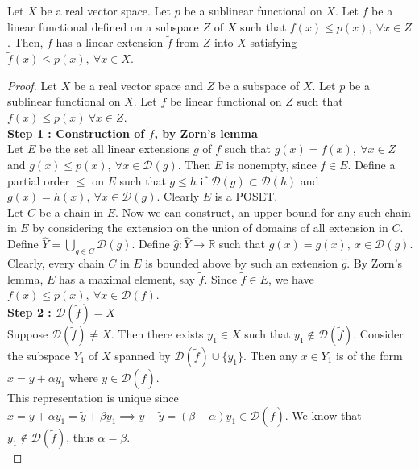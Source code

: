 \begin{theorem}
	Let $X$ be a real vector space.
	Let $p$ be a sublinear functional on $X$.
	Let $f$ be a linear functional defined on a subspace $Z$ of $X$ such that $f(x) \le p(x),\ \forall x \in Z$.
	Then, $f$ has a linear extension $\tilde{f}$ from $Z$ into $X$ satisfying $\tilde{f}(x) \le p(x),\ \forall x \in X$.
\end{theorem}
\begin{proof}
	Let $X$ be a real vector space and $Z$ be a subspace of $X$.
	Let $p$ be a sublinear functional on $X$.
	Let $f$ be linear functional on $Z$ such that $f(x) \le p(x)\ \forall x \in Z$.\\

	\textbf{Step 1 : Construction of $\tilde{f}$, by Zorn's lemma}\\
	Let $E$ be the set all linear extensions $g$ of $f$ such that $g(x) = f(x),\ \forall x \in Z$ and $g(x) \le p(x),\ \forall x \in \mathscr{D}(g)$.
	Then $E$ is nonempty, since $f \in E$.
	Define a partial order $\le$ on $E$ such that $g \le h$ if $\mathscr{D}(g) \subset \mathscr{D}(h)$ and $g(x) = h(x),\ \forall x \in \mathscr{D}(g)$.
	Clearly $E$ is a POSET.\\

	Let $C$ be a chain in $E$.
	Now we can construct, an upper bound for any such chain in $E$ by considering the extension on the union of domains of all extension in $C$.
	Define $\displaystyle \hat{Y} = \bigcup_{g \in C} \mathscr{D}(g)$.
	Define $\hat{g} : \hat{Y} \to \mathbb{R}$ such that $\hat{g}(x) = g(x),\ x \in \mathscr{D}(g)$.
	Clearly, every chain $C$ in $E$ is bounded above by such an extension $\hat{g}$.
	By Zorn's lemma, $E$ has a maximal element, say $\tilde{f}$.
	Since $\tilde{f} \in E$, we have $f(x) \le p(x),\ \forall x \in \mathscr{D}(f)$.\\

	\textbf{Step 2 : $\mathscr{D}(\tilde{f}) = X$}\\
	Suppose $\mathscr{D}(\tilde{f}) \ne X$.
	Then there exists $y_1 \in X$ such that $y_1 \notin \mathscr{D}(\tilde{f})$.
	Consider the subspace $Y_1$ of $X$ spanned by $\mathscr{D}(\tilde{f}) \cup \{ y_1 \}$.
	Then any $x \in Y_1$ is of the form $x = y + \alpha y_1$ where $y \in \mathscr{D}(\tilde{f})$.\\

	This representation is unique since $x = y + \alpha y_1 = \tilde{y} + \beta y_1 \implies y-\tilde{y} = (\beta-\alpha)y_1 \in \mathscr{D}(\tilde{f})$.
	We know that $y_1 \notin \mathscr{D}(\tilde{f})$, thus $\alpha = \beta$.\\


\end{proof}
